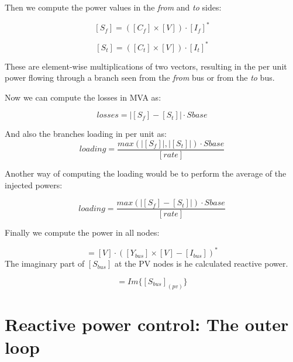 \documentclass[nols,a4paper,twoside,notoc,fleqn]{tufte-book}
\begin{document}
Then we compute the power values in the \textit{from} and \textit{to} sides:

\begin{equation}
{[S_f] = ([C_f] \times [V]) \cdot [I_f]^*}
\end{equation}

\begin{equation}
{[S_t] = ([C_t] \times [V]) \cdot [I_t]^*}
\end{equation}

These are element-wise multiplications of two vectors, resulting in the per unit power flowing through a branch seen from the \textit{from} bus or from the \textit{to} bus.

Now we can compute the losses in MVA as:

\begin{equation}
{{losses} = |[S_f] - [S_t]| \cdot Sbase}
\end{equation}

And also the branches loading in per unit as:
\begin{equation}
{{loading} = \frac{max(|[S_f]|, |[S_t]|) \cdot Sbase}{ [rate]}}
\end{equation}

Another way of computing the loading would be to perform the average of the injected powers:

\begin{equation}
{{loading} = \frac{max(|[S_f] - [S_t]|) \cdot Sbase}{ [rate]}}
\end{equation}



Finally we compute the power in all nodes:

\begin{equation}
[S_{bus}] = [V] \cdot \left([Y_{bus}] \times [V] - [I_{bus}] \right)^*
\end{equation}
The imaginary part of $[S_{bus}]$ at the PV nodes is he calculated reactive power.


\begin{equation}
[Q_{pv}] = Im \{[S_{bus}]_{(pv)} \}
\end{equation}



\newpage
\section{Reactive power control: The outer loop}
\end{document}
